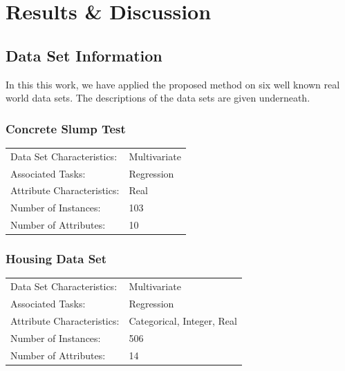 \documentclass[11pt, a4paper]{report}
\begin{document}
\newpage


%
%
%
%

\newpage

\chapter{Results \& Discussion}

\section{Data Set Information}
In this this work, we have applied the proposed method on six well known real world data sets. The descriptions of the data sets are given underneath.
\subsection{Concrete Slump Test}
\begin{tabular}{l l}
	Data Set Characteristics:  & Multivariate \\
	Associated Tasks: & Regression  \\
	Attribute Characteristics: & Real \\
	Number of Instances: & 103 \\
	Number of Attributes: & 10 \\
\end{tabular}

\subsection{Housing Data Set}
\begin{tabular}{l l}
	Data Set Characteristics:  & Multivariate \\
	Associated Tasks: & Regression  \\
	Attribute Characteristics: & Categorical, Integer, Real \\
	Number of Instances: & 506 \\
	Number of Attributes: & 14 \\
\end{tabular}
\end{document}
